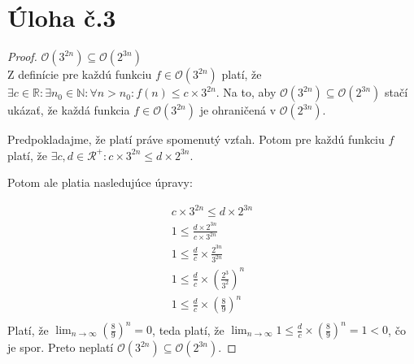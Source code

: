 \documentclass[10pt]{article}
\begin{document}
\section*{Úloha č.3}
\begin{proof}
$\mathcal{O}(3^{2n}) \subseteq \mathcal{O}(2^{3n})$ \\
Z definície pre každú funkciu $f \in \mathcal{O}(3^{2n})$ platí, že $\exists c \in \mathbb{R}: \exists n_0 \in \mathbb{N}: \forall n > n_0: f(n) \leq c\times 3^{2n}$.  
Na to, aby $\mathcal{O}(3^{2n}) \subseteq \mathcal{O}(2^{3n})$ stačí ukázať, že každá funkcia $f \in \mathcal{O}(3^{2n})$ je ohraničená v $\mathcal{O}(2^{3n})$.

Predpokladajme, že platí práve spomenutý vzťah. Potom pre každú funkciu $f$ platí, že $\exists c,d \in \mathcal{R}^+: c \times 3^{2n} \leq d \times 2^{3n}$. 

Potom ale platia nasledujúce úpravy:

\begin{align*}
    c \times 3^{2n} \leq d \times 2^{3n}  \\
    1 \leq \frac{d \times 2^{3n}}{c \times 3^{2n}} \\
    1 \leq \frac{d}{c} \times \frac{2^{3n}}{3^{2n}} \\
    1 \leq \frac{d}{c} \times (\frac{2^{3}}{3^{2}})^n \\
    1 \leq \frac{d}{c} \times (\frac{8}{9})^n \\
\end{align*}
Platí, že $\lim_{n \to \infty} (\frac{8}{9})^n = 0$, teda platí, že $\lim_{n \to \infty} 1 \leq \frac{d}{c} \times (\frac{8}{9})^n  = 1 < 0$, čo je spor.
Preto neplatí $\mathcal{O}(3^{2n}) \subseteq \mathcal{O}(2^{3n})$.
\end{proof}
\end{document}

